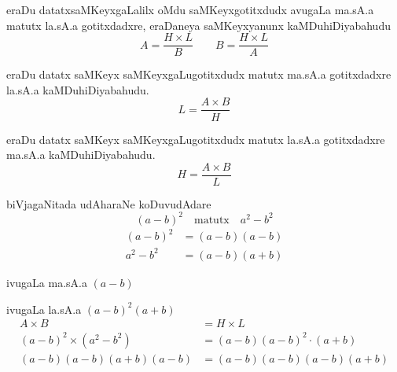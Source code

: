 eraDu datatxsaMKeyxgaLalilx oMdu saMKeyxgotitxdudx avugaLa ma.sA.a matutx la.sA.a gotitxdadxre, eraDaneya saMKeyxyanunx kaMDuhiDiyabahudu
$$
A= \frac{H \times L}{B} \qquad  B= \frac{H \times L}{A}
$$

eraDu datatx saMKeyx saMKeyxgaLugotitxdudx matutx ma.sA.a gotitxdadxre la.sA.a kaMDuhiDiyabahudu.
$$
L=\frac{A\times B}{H}
$$

eraDu datatx saMKeyx saMKeyxgaLugotitxdudx matutx la.sA.a gotitxdadxre ma.sA.a kaMDuhiDiyabahudu.
$$
H=\frac{A\times B}{L}
$$

biVjagaNitada udAharaNe koDuvudAdare
$$
(a-b)^2 \quad\text{matutx}\quad a^{2}-b^{2}
$$
\begin{align*}
(a-b)^2 &= (a-b)(a-b)\\
a^2-b^2 &= (a-b)(a+b)
\end{align*}

ivugaLa ma.sA.a $(a-b)$

ivugaLa la.sA.a $(a-b)^2(a+b)$
\begin{align*}
A\times B &= H\times L\\
(a-b)^2 \times (a^2-b^2) &= (a-b)(a-b)^2\cdot(a+b)\\
(a-b)(a-b)(a+b)(a-b) &= (a-b)(a-b)(a-b)(a+b)
\end{align*}
